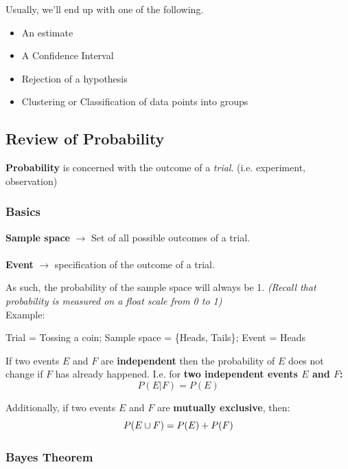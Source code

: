 \documentclass[english, 10pt]{article}
\begin{document}
Usually, we'll end up with one of the following.
\begin{itemize}
	\item An estimate
	\item A Confidence Interval
	\item Rejection of a hypothesis
	\item Clustering or Classification of data points into groups
\end{itemize}

\subsection{Review of Probability}

\textbf{Probability} is concerned with the outcome of a \textit{trial}. (i.e. experiment, observation)\\

\subsubsection{Basics}

\begin{tcolorbox}[title=Definitions:,colframe=red!75!black,colback=red!5!white,arc=0pt,fonttitle=\bfseries]
\textbf{Sample space} $\rightarrow$ Set of all possible outcomes of a trial.\\\\
\textbf{Event} $\rightarrow$ specification of the outcome of a trial.
\end{tcolorbox}

\hfill \break As such, the probability of the sample space will always be 1. \textit{(Recall that probability is measured on a float scale from 0 to 1)}\\

Example:\\

\begin{myproof}
Trial = Tossing a coin; Sample space = \{Heads, Tails\}; Event = Heads
\end{myproof}

\hfill \break If two events $E$ and $F$ are \textbf{independent} then the probability of $E$ does not change if $F$ has already happened. I.e. for \textbf{two independent events $E$ and $F$:} $$ P(E|F) = P(E) $$

Additionally, if two events $E$ and $F$ are \textbf{mutually exclusive}, then: $$P(E \cup F) = P(E) + P(F)$$

\subsubsection{Bayes Theorem}
\end{document}
